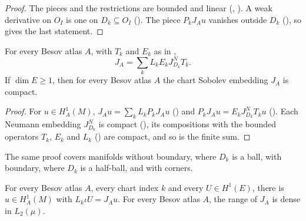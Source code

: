 \begin{proof}
\leanok
The pieces and the restrictions are bounded and linear (,
). A weak derivative on $O_I$ is one on $D_k \subseteq O_I$
(). The piece $P_k J_A u$ vanishes outside $D_k$
(), so  gives the last statement.
\end{proof}

\begin{theorem}
\label{thm:chart-rellich}
\leanok
{}
For every Besov atlas $A$, with $T_k$ and $E_k$ as in ,
\[
  J_A = \sum_k L_k E_k J^N_{D_k} T_k .
\]
If $\dim E \geq 1$, then for every Besov atlas $A$ the chart Sobolev embedding $J_A$ is compact.
\end{theorem}

\begin{proof}
\leanok
For $u \in H^1_A(M)$, $J_A u = \sum_k L_k P_k J_A u$ () and
$P_k J_A u = E_k J^N_{D_k} T_k u$ (). Each Neumann embedding
$J^N_{D_k}$ is compact (), its compositions with the bounded operators
$T_k$, $E_k$ and $L_k$ () are compact, and so is the finite sum.
\end{proof}

The same proof covers manifolds without boundary, where $D_k$ is a ball, with boundary, where
$D_k$ is a half-ball, and with corners.

\begin{lemma}
\label{lem:chart-sobolev-dense}
\leanok
{}
For every Besov atlas $A$, every chart index $k$ and every $U \in H^1(E)$, there is
$u \in H^1_A(M)$ with $L_k \iota U = J_A u$. For every Besov atlas $A$, the range of $J_A$ is
dense in $L_2(\mu)$.
\end{lemma}

